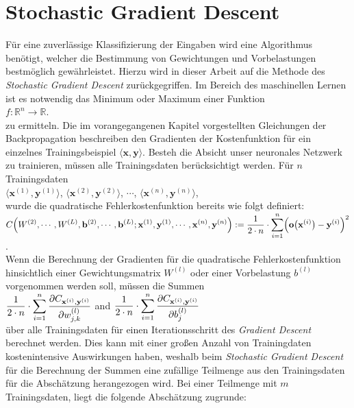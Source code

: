 \section{Stochastic Gradient Descent}
Für eine zuverlässige Klassifizierung der Eingaben wird eine Algorithmus benötigt, welcher die Bestimmung von Gewichtungen und Vorbelastungen bestmöglich gewährleistet. Hierzu wird in dieser Arbeit auf die Methode des \textit{Stochastic Gradient Descent} zurückgegriffen. Im Bereich des maschinellen Lernen ist es notwendig das Minimum oder Maximum einer Funktion \\[0.2cm]
\hspace*{1.3cm}
$f:\mathbb{R}^n \rightarrow \mathbb{R}$.
\\[0.2cm]
zu ermitteln. Die im vorangegangenen Kapitel vorgestellten Gleichungen der Backpropagation beschreiben den Gradienten der Kostenfunktion für ein einzelnes Trainingsbeispiel $\langle\mathbf{x}, \mathbf{y}\rangle$. Besteh die Absicht unser neuronales Netzwerk zu trainieren, müssen alle Trainingsdaten berücksichtigt werden. Für $n$ Trainingsdaten 
\\[0.2cm]
\hspace*{1.3cm}
$\langle\mathbf{x}^{(1)}, \mathbf{y}^{(1)}\rangle$,
$\langle\mathbf{x}^{(2)}, \mathbf{y}^{(2)}\rangle$,
$\cdots$,
$\langle\mathbf{x}^{(n)}, \mathbf{y}^{(n)}\rangle$,
\\[0.2cm]
wurde die quadratische Fehlerkostenfunktion bereits wie folgt definiert: 
\\[0.2cm]
\hspace*{1.3cm}
$\displaystyle C\Bigr(W^{(2)}, \cdots, W^{(L)}, \mathbf{b}^{(2)}, \cdots, \mathbf{b}^{(L)};
     \mathbf{x}^{(1)}, \mathbf{y}^{(1)}, \cdots, \mathbf{x}^{(n)},\mathbf{y}^{(n)} \Bigr) := 
 \frac{1}{2 \cdot n} \cdot \sum\limits_{i=1}^n \Bigl(\mathbf{o}\bigl(\mathbf{x}^{(i)}\bigr) - \mathbf{y}^{(i)}\Bigr)^2
$.
\\[0.2cm]
Wenn die Berechnung der Gradienten für die quadratische Fehlerkostenfunktion hinsichtlich einer Gewichtungsmatrix $W^{(l)}$ oder einer Vorbelastung $b^{(l)}$ vorgenommen werden soll, müssen die Summen
\\[0.2cm]
\hspace*{1.3cm}
$\displaystyle \frac{1}{2\cdot n} \cdot \sum\limits_{i=1}^n \frac{\partial C_{\mathbf{x}^{(i)}, \mathbf{y}^{(i)}}}{\partial w_{j,k}^{(l)}}$
\quad and \quad
$\displaystyle \frac{1}{2\cdot n} \cdot \sum\limits_{i=1}^n \frac{\partial C_{\mathbf{x}^{(i)}, \mathbf{y}^{(i)}}}{\partial b_{j}^{(l)}}$
\\[0.2cm]
über alle Trainingsdaten für einen Iterationsschritt des \textit{Gradient Descent} berechnet werden. Dies kann mit einer großen Anzahl von Trainingdaten kostenintensive Auswirkungen haben, weshalb beim \textit{Stochastic Gradient Descent} für die Berechnung der Summen eine zufällige Teilmenge aus den Trainingsdaten für die Abschätzung herangezogen wird. Bei einer Teilmenge mit $m$ Trainingsdaten, liegt die folgende Abschätzung zugrunde:
